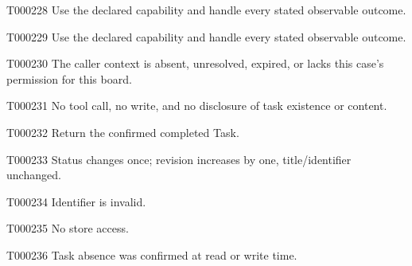 \documentclass[11pt,a4paper]{article}
\begin{document}
\begin{atlasparagraph}{T000228}
Use the declared capability and handle every stated observable outcome.
\end{atlasparagraph}
\begin{atlasparagraph}{T000229}
Use the declared capability and handle every stated observable outcome.
\end{atlasparagraph}
\begin{atlasparagraph}{T000230}
The caller context is absent, unresolved, expired, or lacks this case's permission for this board.
\end{atlasparagraph}
\begin{atlasparagraph}{T000231}
No tool call, no write, and no disclosure of task existence or content.
\end{atlasparagraph}
\begin{atlasparagraph}{T000232}
Return the confirmed completed Task.
\end{atlasparagraph}
\begin{atlasparagraph}{T000233}
Status changes once; revision increases by one, title/identifier unchanged.
\end{atlasparagraph}
\begin{atlasparagraph}{T000234}
Identifier is invalid.
\end{atlasparagraph}
\begin{atlasparagraph}{T000235}
No store access.
\end{atlasparagraph}
\begin{atlasparagraph}{T000236}
Task absence was confirmed at read or write time.
\end{atlasparagraph}
\end{document}
